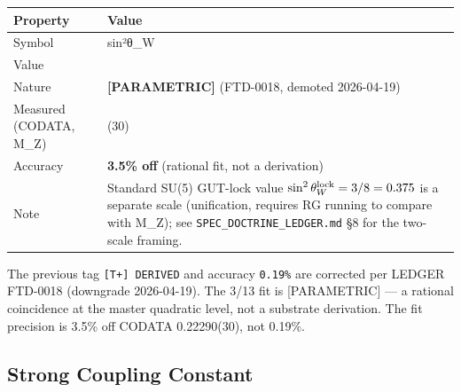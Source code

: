 \documentclass[
  11pt,
  letterpaper,
  twoside,
  openany]{book}
\makeatletter
\let\orig@subsection\subsection
\renewcommand{\subsection}{\needspace{6\baselineskip}\orig@subsection}
\makeatother
\begin{document}
\begin{longtable}[]{@{}
  >{\raggedright\arraybackslash}p{}
  >{\raggedright\arraybackslash}p{}@{}}
\toprule\noalign{}
\begin{minipage}[b]{\linewidth}\raggedright
Property
\end{minipage} & \begin{minipage}[b]{\linewidth}\raggedright
Value
\end{minipage} \\
\midrule\noalign{}
\endhead
\bottomrule\noalign{}
\endlastfoot
Symbol & sin²θ\_W \\
Value & 0.2308 \\
Nature & \textbf{{[}PARAMETRIC{]}} (FTD-0018, demoted 2026-04-19) \\
Measured (CODATA, M\_Z) & 0.22290(30) \\
Accuracy & \textbf{3.5\% off} (rational fit, not a derivation) \\
Note & Standard SU(5) GUT-lock value
\(\sin^2\theta_W^{\rm lock} = 3/8 = 0.375\) is a separate scale
(unification, requires RG running to compare with M\_Z); see
\texttt{SPEC\_DOCTRINE\_LEDGER.md} §8 for the two-scale framing. \\
\end{longtable}

\begin{tcolorbox}[enhanced jigsaw, colbacktitle=quarto-callout-warning-color!10!white, titlerule=0mm, bottomtitle=1mm, bottomrule=.15mm, colback=white, arc=.35mm, breakable, toprule=.15mm, title=\textcolor{quarto-callout-warning-color}{\faExclamationTriangle}\hspace{0.5em}{Earlier ``DERIVED at 0.19\%'' framing was wrong}, rightrule=.15mm, coltitle=black, leftrule=.75mm, colframe=quarto-callout-warning-color-frame, toptitle=1mm, opacityback=0, opacitybacktitle=0.6, left=2mm]

The previous tag \texttt{{[}T+{]}\ DERIVED} and accuracy \texttt{0.19\%}
are corrected per LEDGER FTD-0018 (downgrade 2026-04-19). The 3/13 fit
is {[}PARAMETRIC{]} --- a rational coincidence at the master quadratic
level, not a substrate derivation. The fit precision is 3.5\% off CODATA
0.22290(30), not 0.19\%.

\end{tcolorbox}

\subsection{Strong Coupling Constant}\label{strong-coupling-constant}
\end{document}
